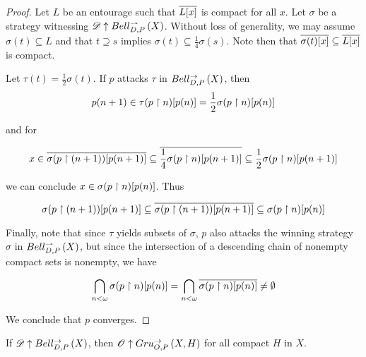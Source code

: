\begin{proof}
  Let $L$ be an entourage such that $\overline{L[x]}$ is compact
  for all $x$.
  Let $\sigma$ be a strategy witnessing $\mathscr{D}\uparrow Bell_{D,P}^{\rightharpoonup}\left({X}\right)$.
  Without loss of generality, we may assume $\sigma(t)\subseteq L$ and that
  $t \supseteq s$ implies $\sigma(t)\subseteq \frac{1}{4}\sigma(s)$.
  Note then that $\overline{\sigma(t)[x]}\subseteq\overline{L[x]}$ is compact.

  Let $\tau(t)=\frac{1}{2}\sigma(t)$. If $p$ attacks $\tau$
  in $Bell_{D,P}^{\to}\left({X}\right)$, then
    \[
      p(n+1)
        \in
      \tau(p\restriction n)[p(n)]
        =
      \frac{1}{2}\sigma(p\restriction n)[p(n)]
    \]

  \noindent and for

    \[
      x
        \in
      \overline{\sigma(p\restriction (n+1))[p(n+1)]}
        \subseteq
      \overline{\frac{1}{4}\sigma(p\restriction n)[p(n+1)]}
        \subseteq
      \frac{1}{2}\sigma(p\restriction n)[p(n+1)]
    \]

  \noindent we can conclude $x\in\sigma(p\restriction n)[p(n)]$. Thus

    \[
      \sigma(p\restriction (n+1))[p(n+1)]
        \subseteq
      \overline{\sigma(p\restriction (n+1))[p(n+1)]}
        \subseteq
      \sigma(p\restriction n)[p(n)]
    \]

  Finally, note that since $\tau$ yields subsets of $\sigma$, $p$ also attacks
  the winning strategy $\sigma$ in $Bell_{D,P}^{\rightharpoonup}\left({X}\right)$, but since the intersection
  of a descending chain of nonempty compact sets is nonempty, we have

    \[
      \bigcap_{n<\omega} \sigma(p\restriction n)[p(n)]
        =
      \bigcap_{n<\omega} \overline{\sigma(p\restriction n)[p(n)]}
        \not=
      \emptyset
    \]

  We conclude that $p$ converges.
\end{proof}


\begin{lem}
  If $\mathscr{D}\uparrow Bell_{D,P}^{\to}\left({X}\right)$, then $\mathscr{O}\uparrow Gru_{O,P}^{\to}\left({X},{H}\right)$ for
  all compact $H$ in $X$.
\end{lem}


